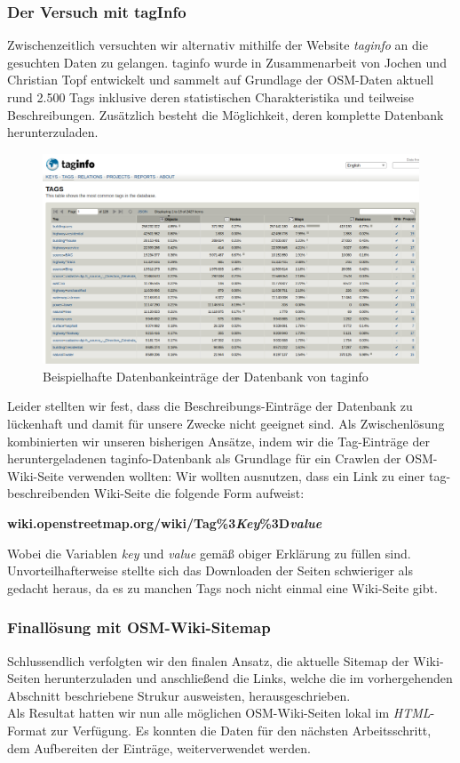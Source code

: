 \documentclass[12pt,pdftex,a4paper]{article}
\begin{document}
\subsubsection{Der Versuch mit tagInfo}\label{sec:tagInfo}
Zwischenzeitlich versuchten wir alternativ mithilfe der Website \textit{taginfo} \cite{taginfoWebsite} an die gesuchten Daten zu gelangen. taginfo wurde in Zusammenarbeit von Jochen und Christian Topf entwickelt und sammelt auf Grundlage der OSM-Daten aktuell rund 2.500 Tags inklusive deren statistischen Charakteristika und teilweise Beschreibungen\cite{taginfoAbout}. Zusätzlich besteht die Möglichkeit, deren komplette Datenbank herunterzuladen.\\
\begin{figure}[h]
	\centering
	\includegraphics[width=0.9\linewidth]{Bilder/taginfo_example}
	\caption[Beispielhafte Darstellung taginfo]{Beispielhafte Datenbankeinträge der Datenbank von taginfo}
	\label{fig:taginfoexample}
\end{figure}
Leider stellten wir fest, dass die Beschreibungs-Einträge der Datenbank zu lückenhaft und damit für unsere Zwecke nicht geeignet sind.
Als Zwischenlösung kombinierten wir unseren bisherigen Ansätze, indem wir die Tag-Einträge der heruntergeladenen taginfo-Datenbank als Grundlage für ein Crawlen der OSM-Wiki-Seite verwenden wollten: Wir wollten ausnutzen, dass ein Link zu einer tag-beschreibenden Wiki-Seite die folgende Form aufweist:
\begin{center}
	\textbf{wiki.openstreetmap.org/wiki/Tag\%3\textit{Key}\%3D\textit{value}}
\end{center}
Wobei die Variablen \textit{key} und \textit{value} gemäß obiger Erklärung zu füllen sind. Unvorteilhafterweise stellte sich das Downloaden der Seiten schwieriger als gedacht heraus, da es zu manchen Tags noch nicht einmal eine Wiki-Seite gibt.

\subsubsection{Finallösung mit OSM-Wiki-Sitemap}
Schlussendlich verfolgten wir den finalen Ansatz, die aktuelle Sitemap der Wiki-Seiten\cite{sitemap-index-wiki-link} herunterzuladen und anschließend die Links, welche die im vorhergehenden Abschnitt beschriebene Strukur ausweisten, herausgeschrieben.\\
Als Resultat hatten wir nun alle möglichen OSM-Wiki-Seiten lokal im \textit{HTML}-Format zur Verfügung. Es konnten die Daten für den nächsten Arbeitsschritt, dem Aufbereiten der Einträge, weiterverwendet werden.
\end{document}
